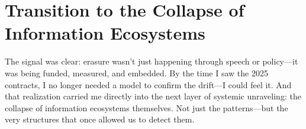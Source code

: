 \section{Transition to the Collapse of Information Ecosystems}
\label{sec:transition_ch3}

The signal was clear: erasure wasn’t just happening through speech or policy—it was being funded, measured, and embedded. By the time I saw the 2025 contracts, I no longer needed a model to confirm the drift—I could feel it. And that realization carried me directly into the next layer of systemic unraveling: the collapse of information ecosystems themselves. Not just the patterns—but the very structures that once allowed us to detect them.

